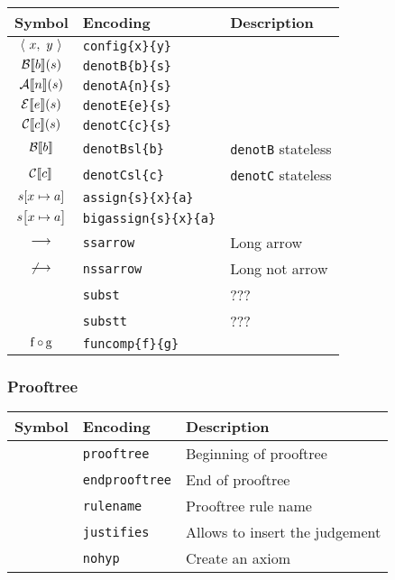 \documentclass[11pt]{article}
\begin{document}
\begin{table}[H]
	\def\arraystretch{1.5}
	\begin{tabular}{c l l}
		\textbf{Symbol} & \textbf{Encoding} & \textbf{Description} \\
		\hline 
		$\langle\ x,\ y\ \rangle$ & \texttt{config\{x\}\{y\}} &  \\ 
		$\mathcal{B} \llbracket b \rrbracket (s)$ & \texttt{denotB\{b\}\{s\}} &  \\
		$\mathcal{A} \llbracket n \rrbracket (s)$ & \texttt{denotA\{n\}\{s\}} &  \\
		$\mathcal{E} \llbracket e \rrbracket (s)$ & \texttt{denotE\{e\}\{s\}} &  \\
		$\mathcal{C} \llbracket c \rrbracket (s)$ & \texttt{denotC\{c\}\{s\}} &  \\
		$\mathcal{B} \llbracket b \rrbracket$ & \texttt{denotBsl\{b\}} & \texttt{denotB} stateless \\
		$\mathcal{C} \llbracket c \rrbracket$ & \texttt{denotCsl\{c\}} & \texttt{denotC} stateless \\
		$s[x\mapsto a]$ & \texttt{assign\{s\}\{x\}\{a\}} &  \\
		$s\bigl[x\mapsto a\bigr]$ & \texttt{bigassign\{s\}\{x\}\{a\}} &  \\
		$\longrightarrow$ & \texttt{ssarrow} & Long arrow \\
		$\not \longrightarrow$ & \texttt{nssarrow} & Long not arrow \\
		 & \texttt{subst} & ??? \\
		 & \texttt{substt} & ??? \\
		$\mathrm{f}\mathop{\circ}\mathrm{g}$ & \texttt{funcomp\{f\}\{g\}} &  \\
	\end{tabular} 
\end{table} 

\subsubsection{Prooftree}

\begin{table}[H]
	\def\arraystretch{1.5}
	\begin{tabular}{c l l}
		\textbf{Symbol} & \textbf{Encoding} & \textbf{Description} \\
		\hline 
		 & \texttt{prooftree} & Beginning of prooftree \\
		 & \texttt{endprooftree} & End of prooftree \\
		 & \texttt{rulename} & Prooftree rule name \\
		 & \texttt{justifies} & Allows to insert the judgement \\
		 & \texttt{nohyp} & Create an axiom \\
	\end{tabular} 
\end{table} 
\end{document}
